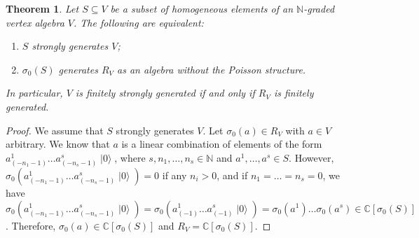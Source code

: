 \documentclass[a4paper, 12pt, reqno]{amsart}
\newtheorem{theorem}{Theorem}[section]
\theoremstyle{remark}
\DeclareMathOperator{\vac}{|0\rangle}
\begin{document}
\begin{theorem}
  \label{thr:56}
  Let $S \subseteq V$ be a subset of homogeneous elements of an $\mathbb{N}$-graded vertex algebra $V$.
  The following are equivalent:
  \begin{enumerate}
  \item $S$ strongly generates $V$;
  \item $\sigma_0(S)$ generates $R_V$ as an algebra without the Poisson structure.
  \end{enumerate}
  In particular, $V$ is finitely strongly generated if and only if $R_V$ is finitely generated.
\end{theorem}

\begin{proof}
  We assume that $S$ strongly generates $V$.
  Let $\sigma_0(a) \in R_V$ with $a \in V$ arbitrary.
  We know that $a$ is a linear combination of elements of the form $a^1_{(-n_1 - 1)}\dots a^s_{(-n_s - 1)}\vac$, where $s, n_1, \dots, n_s \in \mathbb{N}$ and $a^1, \dots, a^s \in S$.
  However, $\sigma_0(a^1_{(-n_1 - 1)}\dots a^s_{(-n_s - 1)}\vac) = 0$ if any $n_i > 0$, and if $n_1 = \dots = n_s = 0$, we have $\sigma_0(a^1_{(-n_1 - 1)}\dots a^s_{(-n_s - 1)}\vac) = \sigma_0(a^1_{(-1)}\dots a^s_{(-1)}\vac) = \sigma_0(a^1)\dots\sigma_0(a^s) \in \mathbb{C}[\sigma_0(S)]$.
  Therefore, $\sigma_0(a) \in \mathbb{C}[\sigma_0(S)]$ and $R_V = \mathbb{C}[\sigma_0(S)]$.


\end{proof}
\end{document}
